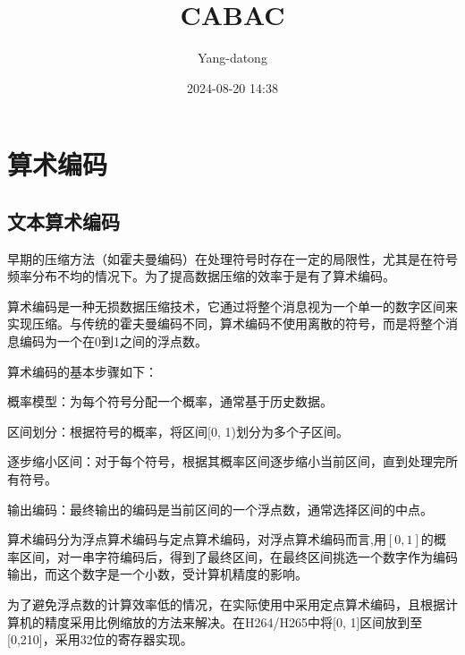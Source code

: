 \documentclass{/Users/hi/Study/template/code}
\title{CABAC}
\author{\textcopyright Yang-datong }
\date{2024-08-20 14:38}
\begin{document}
\makehead


\section{算术编码}
\subsection{文本算术编码}
早期的压缩方法（如霍夫曼编码）在处理符号时存在一定的局限性，尤其是在符号频率分布不均的情况下。为了提高数据压缩的效率于是有了算术编码。

算术编码是一种无损数据压缩技术，它通过将整个消息视为一个单一的数字区间来实现压缩。与传统的霍夫曼编码不同，算术编码不使用离散的符号，而是将整个消息编码为一个在0到1之间的浮点数。

算术编码的基本步骤如下：
\begin{serialNumber}
	\item 概率模型：为每个符号分配一个概率，通常基于历史数据。
	\item 区间划分：根据符号的概率，将区间[0, 1)划分为多个子区间。
	\item 逐步缩小区间：对于每个符号，根据其概率区间逐步缩小当前区间，直到处理完所有符号。
	\item 输出编码：最终输出的编码是当前区间的一个浮点数，通常选择区间的中点。
\end{serialNumber}

算术编码分为浮点算术编码与定点算术编码，对浮点算术编码而言,用$[0, 1]$的概率区间，对一串字符编码后，得到了最终区间，在最终区间挑选一个数字作为编码输出，而这个数字是一个小数，受计算机精度的影响。
\begin{remark}
	为了避免浮点数的计算效率低的情况，在实际使用中采用定点算术编码，且根据计算机的精度采用比例缩放的方法来解决。在H264/H265中将[0, 1]区间放到至[0,210]，采用32位的寄存器实现。
\end{remark}
\end{document}
